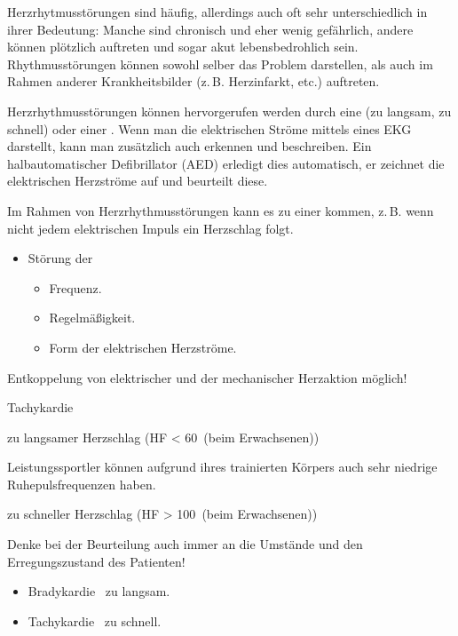 \label{topic:herzrhythmusstoerungen}

Herzrhytmusstörungen sind häufig, allerdings auch oft sehr unterschiedlich in
ihrer Bedeutung: Manche sind chronisch und eher wenig gefährlich, andere können
plötzlich auftreten und sogar akut lebensbedrohlich sein. Rhythmusstörungen
können sowohl selber das Problem darstellen, als auch  im
Rahmen anderer Krankheitsbilder (z.\,B. Herzinfarkt, etc.) auftreten.

{
Herzrhythmusstörungen können hervorgerufen werden durch eine  (zu langsam, zu schnell) oder einer .
Wenn man die elektrischen Ströme mittels eines EKG darstellt, kann man
zusätzlich auch  erkennen
und beschreiben. Ein halbautomatischer Defibrillator (AED) erledigt dies
automatisch, er zeichnet die elektrischen Herzströme auf und beurteilt diese. 

Im Rahmen von Herzrhythmusstörungen kann es zu einer  kommen, z.\,B. wenn nicht jedem
elektrischen Impuls ein Herzschlag folgt. 
}{
\begin{itemize}
  \item Störung der
  \begin{itemize}
    \item Frequenz.
    \item Regelmäßigkeit.
    \item Form der elektrischen Herzströme.
  \end{itemize}
\end{itemize}

Entkoppelung von elektrischer und der mechanischer Herzaktion möglich!
}{}{}{}

{%
%
\begin{labeling}[~--]{Tachykardie}
  \item[\T{Bradykardie}]  zu langsamer Herzschlag
  ({HF \textless} 60\, {\tiny (beim Erwachsenen)})
  
  Leistungssportler können aufgrund ihres trainierten Körpers auch sehr
  niedrige Ruhepulsfrequenzen haben.
  \item[\T{Tachykardie}]  zu schneller
  Herzschlag
  (HF {\textgreater} 100\, {\tiny (beim
  Erwachsenen)})
\end{labeling}

Denke bei der Beurteilung auch immer an die Umstände und den
Erregungszustand des Patienten!
}{
\begin{itemize}
  \item Bradykardie \dotfill\ zu langsam. 
  \item Tachykardie \dotfill\ zu schnell. 
\end{itemize}
}{}{}{}

